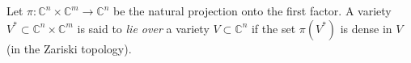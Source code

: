Let $\pi : \mathbb{C}^n \times \mathbb{C}^m \to \mathbb{C}^n$ be the natural projection onto the first factor. A variety $V^* \subset \mathbb{C}^n \times \mathbb{C}^m$ is said to \textit{lie over} a variety $V \subset \mathbb{C}^n$ if the set $\pi(V^*)$ is dense in $V$ (in the Zariski topology).
